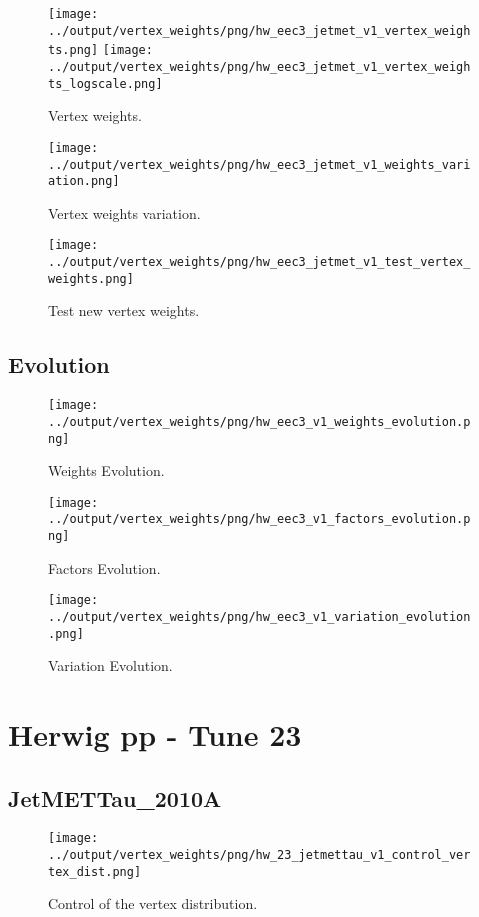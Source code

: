 \documentclass[11pt]{book}
\begin{document}
\begin{figure}[ht]
\centering
\texttt{[image: ../output/vertex\_weights/png/hw\_eec3\_jetmet\_v1\_vertex\_weights.png]}
\texttt{[image: ../output/vertex\_weights/png/hw\_eec3\_jetmet\_v1\_vertex\_weights\_logscale.png]}
\caption{Vertex weights.}
\end{figure}

\begin{figure}[ht]
\centering
\texttt{[image: ../output/vertex\_weights/png/hw\_eec3\_jetmet\_v1\_weights\_variation.png]}
\caption{Vertex weights variation.}
\end{figure}

\begin{figure}[ht]
\centering
\texttt{[image: ../output/vertex\_weights/png/hw\_eec3\_jetmet\_v1\_test\_vertex\_weights.png]}
\caption{Test new vertex weights.}
\end{figure}
\clearpage

\subsection{Evolution}
\begin{figure}[ht]
\centering
\texttt{[image: ../output/vertex\_weights/png/hw\_eec3\_v1\_weights\_evolution.png]}
\caption{Weights Evolution.}
\end{figure}


\begin{figure}[ht]
\centering
\texttt{[image: ../output/vertex\_weights/png/hw\_eec3\_v1\_factors\_evolution.png]}
\caption{Factors Evolution.}
\end{figure}

\begin{figure}[ht]
\centering
\texttt{[image: ../output/vertex\_weights/png/hw\_eec3\_v1\_variation\_evolution.png]}
\caption{Variation Evolution.}
\end{figure}
\clearpage


\section{Herwig pp - Tune 23}
\subsection{JetMETTau\_2010A}
\begin{figure}[ht]
\centering
\texttt{[image: ../output/vertex\_weights/png/hw\_23\_jetmettau\_v1\_control\_vertex\_dist.png]}
\caption{Control of the vertex distribution.}
\end{figure}
\end{document}
